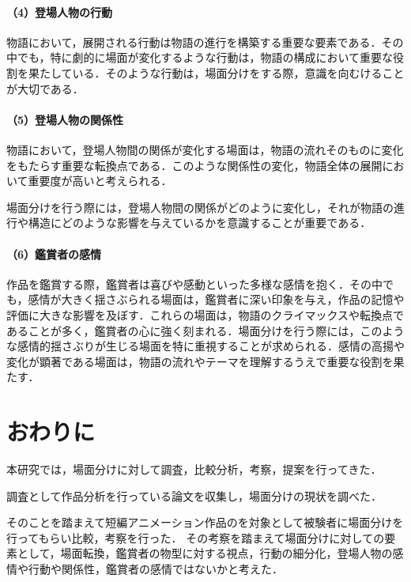 \paragraph*{（4）登場人物の行動}
物語において，展開される行動は物語の進行を構築する重要な要素である．その中でも，特に劇的に場面が変化するような行動は，物語の構成において重要な役割を果たしている．そのような行動は，場面分けをする際，意識を向むけることが大切である．

\paragraph*{（5）登場人物の関係性}
物語において，登場人物間の関係が変化する場面は，物語の流れそのものに変化をもたらす重要な転換点である．このような関係性の変化，物語全体の展開において重要度が高いと考えられる．

場面分けを行う際には，登場人物間の関係がどのように変化し，それが物語の進行や構造にどのような影響を与えているかを意識することが重要である．

\paragraph*{（6）鑑賞者の感情}
作品を鑑賞する際，鑑賞者は喜びや感動といった多様な感情を抱く．その中でも，感情が大きく揺さぶられる場面は，鑑賞者に深い印象を与え，作品の記憶や評価に大きな影響を及ぼす．これらの場面は，物語のクライマックスや転換点であることが多く，鑑賞者の心に強く刻まれる．場面分けを行う際には，このような感情的揺さぶりが生じる場面を特に重視することが求められる．感情の高揚や変化が顕著である場面は，物語の流れやテーマを理解するうえで重要な役割を果たす．




\section{おわりに}
本研究では，場面分けに対して調査，比較分析，考察，提案を行ってきた．

調査として作品分析を行っている論文を収集し，場面分けの現状を調べた．

そのことを踏まえて短編アニメーション作品の\tomjerry を対象として被験者に場面分けを行ってもらい比較，考察を行った．
その考察を踏まえて場面分けに対しての要素として，場面転換，鑑賞者の物型に対する視点，行動の細分化，登場人物の感情や行動や関係性，鑑賞者の感情ではないかと考えた．
